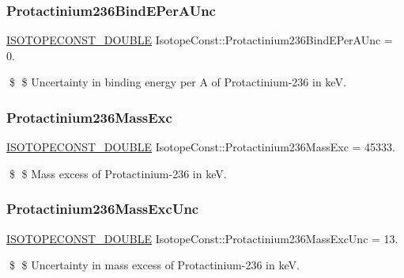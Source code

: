 \subsubsection{\texorpdfstring{Protactinium236\+Bind\+E\+Per\+A\+Unc}{Protactinium236BindEPerAUnc}}
{\footnotesize\ttfamily \mbox{\hyperlink{group___isotope_const-_macros_ga8f45a7272ce02c0b4c65c44636ed719a}{I\+S\+O\+T\+O\+P\+E\+C\+O\+N\+S\+T\+\_\+\+D\+O\+U\+B\+LE}} Isotope\+Const\+::\+Protactinium236\+Bind\+E\+Per\+A\+Unc = 0.}

\$ \$ Uncertainty in binding energy per A of Protactinium-\/236 in keV. \mbox{\label{group___isotope_const-_protactinium-_pa236_ga8be36957c3aed3a3fc0a3ea39908c5e4}} 
\subsubsection{\texorpdfstring{Protactinium236\+Mass\+Exc}{Protactinium236MassExc}}
{\footnotesize\ttfamily \mbox{\hyperlink{group___isotope_const-_macros_ga8f45a7272ce02c0b4c65c44636ed719a}{I\+S\+O\+T\+O\+P\+E\+C\+O\+N\+S\+T\+\_\+\+D\+O\+U\+B\+LE}} Isotope\+Const\+::\+Protactinium236\+Mass\+Exc = 45333.}

\$ \$ Mass excess of Protactinium-\/236 in keV. \mbox{\label{group___isotope_const-_protactinium-_pa236_ga18748d7e833f3c79a9d16b3c89282686}} 
\subsubsection{\texorpdfstring{Protactinium236\+Mass\+Exc\+Unc}{Protactinium236MassExcUnc}}
{\footnotesize\ttfamily \mbox{\hyperlink{group___isotope_const-_macros_ga8f45a7272ce02c0b4c65c44636ed719a}{I\+S\+O\+T\+O\+P\+E\+C\+O\+N\+S\+T\+\_\+\+D\+O\+U\+B\+LE}} Isotope\+Const\+::\+Protactinium236\+Mass\+Exc\+Unc = 13.}

\$ \$ Uncertainty in mass excess of Protactinium-\/236 in keV. \mbox{\label{group___isotope_const-_protactinium-_pa236_ga0dcdf4fdea6fcb01ab6cf69cf1a2152f}} 
